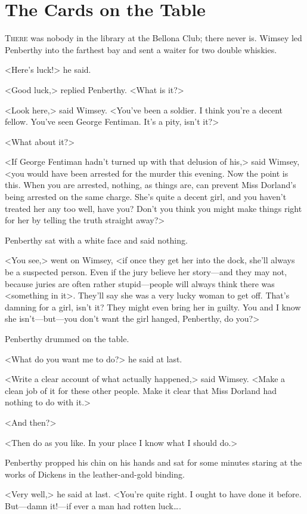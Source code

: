 \chapter{The Cards on the Table}

\lettrine{T}{here} was nobody in the library at the Bellona Club; there never is. Wimsey led Penberthy into the farthest bay and sent a waiter for two double whiskies.

\zz
<Here's luck!> he said.

<Good luck,> replied Penberthy. <What is it?>

<Look here,> said Wimsey. <You've been a soldier. I think you're a decent fellow. You've seen George Fentiman. It's a pity, isn't it?>

<What about it?>

<If George Fentiman hadn't turned up with that delusion of his,> said Wimsey, <you would have been arrested for the murder this evening. Now the point is this. When you are arrested, nothing, as things are, can prevent Miss Dorland's being arrested on the same charge. She's quite a decent girl, and you haven't treated her any too well, have you? Don't you think you might make things right for her by telling the truth straight away?>

Penberthy sat with a white face and said nothing.

<You see,> went on Wimsey, <if once they get her into the dock, she'll always be a suspected person. Even if the jury believe her story—and they may not, because juries are often rather stupid—people will always think there was <something in it>. They'll say she was a very lucky woman to get off. That's damning for a girl, isn't it? They might even bring her in guilty. You and I know she isn't—but—you don't want the girl hanged, Penberthy, do you?>

Penberthy drummed on the table.

<What do you want me to do?> he said at last.

<Write a clear account of what actually happened,> said Wimsey. <Make a clean job of it for these other people. Make it clear that Miss Dorland had nothing to do with it.>

<And then?>

<Then do as you like. In your place I know what I should do.>

Penberthy propped his chin on his hands and sat for some minutes staring at the works of Dickens in the leather-and-gold binding.

<Very well,> he said at last. <You're quite right. I ought to have done it before. But—damn it!—if ever a man had rotten luck\dots.

